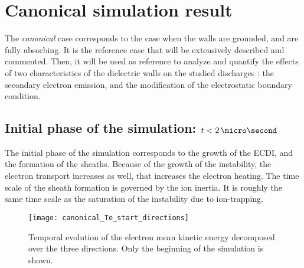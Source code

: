 
\section{Canonical simulation result}
  \label{sec-canonical}
  
  
  The {\it canonical} case corresponds to the case when the walls are grounded, and are fully absorbing. 
  It is the reference case that will be extensively described and commented.
  Then, it will be used as reference to analyze and quantify the effects of two characteristics of the dielectric walls on the studied discharges : the secondary electron emission, and the modification of the electrostatic boundary condition.
  
  \subsection{Initial phase of the simulation\string: \texorpdfstring{$t < 2\,\micro\second$}{ t < 2 microseconds} } \label{subsec-initlaphase}
  
  The initial phase of the simulation corresponds to the growth of the \ac{ECDI}, and the formation of the sheaths.
  Because of the growth of the instability, the electron transport increases as well, that increases the electron heating.
  The time scale of the sheath formation is governed by the ion inertia.
  It is roughly the same time scale as the saturation of the instability due to ion-trapping.
  
  \begin{figure}[hbt]
    \centering
    \texttt{[image: canonical\_Te\_start\_directions]}
    \caption{Temporal evolution of the electron mean kinetic energy decomposed over the three directions. Only the beginning of the simulation is shown.}
    \label{fig-canon_Te_strat}
  \end{figure}
  
